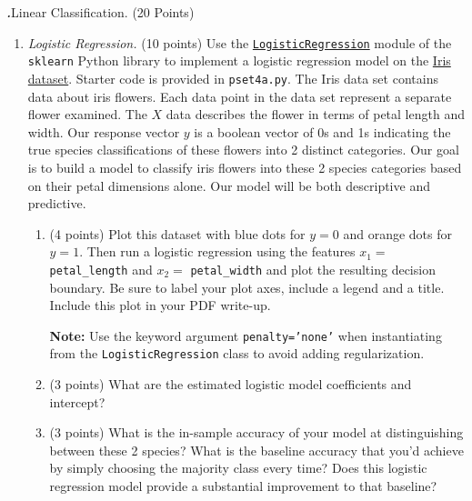 \documentclass[12pt]{amsart}
\newenvironment{statement}[1]{\smallskip\noindent\color[rgb]{0.0,0.0,0.0} {\bf #1.}}{}
\newcommand{\1}{\mathds{1}}
\begin{document}
\newpage

\begin{statement}{4}
\textit{Linear Classification.} (20 Points) 
\begin{enumerate}
    \item \emph{Logistic Regression.} (10 points) Use the \texttt{\href{https://scikit-learn.org/stable/modules/generated/sklearn.linear_model.LogisticRegression.html}{LogisticRegression}} module of the \texttt{sklearn} Python library to implement a logistic regression model on the \href{https://scikit-learn.org/stable/auto_examples/datasets/plot_iris_dataset.html}{Iris dataset}. Starter code is provided in \texttt{pset4a.py}. The Iris data set contains data about iris flowers. Each data point in the data set represent a separate flower examined. The $X$ data describes the flower in terms of petal length and width. Our response vector $y$ is a boolean vector of 0s and 1s indicating the true species classifications of these flowers into 2 distinct categories. Our goal is to build a model to classify iris flowers into these 2 species categories based on their petal dimensions alone. Our model will be both descriptive and predictive. 

    \begin{enumerate}
        \item (4 points) Plot this dataset with blue dots for $y = 0$ and orange dots for $y = 1$. Then run a logistic regression using the features $x_1 =$ \texttt{petal\_length} and $x_2 =$ \texttt{petal\_width} and plot the resulting decision boundary. Be sure to label your plot axes, include a legend and a title. Include this plot in your PDF write-up.
        
        \noindent \textbf{Note:} Use the keyword argument \texttt{penalty='none'} when instantiating from the \texttt{LogisticRegression} class to avoid adding regularization.
        
        \item (3 points) What are the estimated logistic model coefficients and intercept?
        \item (3 points) What is the in-sample accuracy of your model at distinguishing between these 2 species? What is the baseline accuracy that you'd achieve by simply choosing the majority class every time? Does this logistic regression model provide a substantial improvement to that baseline?

        
    \end{enumerate}
    

\end{enumerate}
\end{statement}
\end{document}
